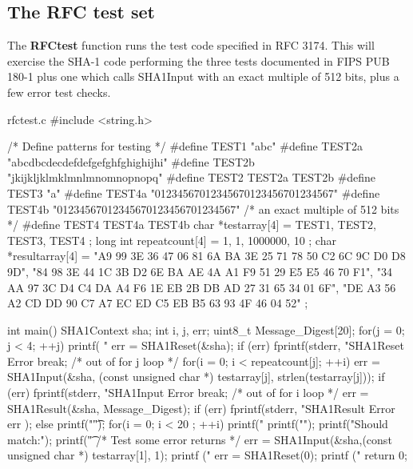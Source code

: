 \subsection{The RFC test set}
\noindent
The {\bf RFCtest} function runs the test code specified in RFC 3174\cite{30}.
This will exercise the SHA-1 code performing the three
tests documented in FIPS PUB 180-1 plus one which calls
SHA1Input with an exact multiple of 512 bits, plus a few
error test checks.
\begin{chunk}{rfctest.c}
#include <string.h>

/* Define patterns for testing */
#define TEST1   "abc"
#define TEST2a  "abcdbcdecdefdefgefghfghighijhi"
#define TEST2b  "jkijkljklmklmnlmnomnopnopq"
#define TEST2   TEST2a TEST2b
#define TEST3   "a"
#define TEST4a  "01234567012345670123456701234567"
#define TEST4b  "01234567012345670123456701234567"
/* an exact multiple of 512 bits */
#define TEST4   TEST4a TEST4b
char *testarray[4] = { TEST1, TEST2, TEST3, TEST4 };
long int repeatcount[4] = { 1, 1, 1000000, 10 };
char *resultarray[4] = {
    "A9 99 3E 36 47 06 81 6A BA 3E 25 71 78 50 C2 6C 9C D0 D8 9D",
    "84 98 3E 44 1C 3B D2 6E BA AE 4A A1 F9 51 29 E5 E5 46 70 F1",
    "34 AA 97 3C D4 C4 DA A4 F6 1E EB 2B DB AD 27 31 65 34 01 6F",
    "DE A3 56 A2 CD DD 90 C7 A7 EC ED C5 EB B5 63 93 4F 46 04 52"
};

int main() {
  SHA1Context sha;
  int i, j, err;
  uint8_t Message_Digest[20];
  for(j = 0; j < 4; ++j) {
    printf( "\nTest %
    err = SHA1Reset(&sha);
    if (err) {
      fprintf(stderr, "SHA1Reset Error %
      break; /* out of for j loop */
    }
    for(i = 0; i < repeatcount[j]; ++i) {
      err = SHA1Input(&sha,
                      (const unsigned char *) testarray[j],
                      strlen(testarray[j]));
      if (err) {
        fprintf(stderr, "SHA1Input Error %
        break;    /* out of for i loop */
      }
    }
    err = SHA1Result(&sha, Message_Digest);
    if (err) {
      fprintf(stderr,
             "SHA1Result Error %
             err );
    } else {
      printf("\t");
      for(i = 0; i < 20 ; ++i) {
        printf("%
      }
      printf("\n");
    }
    printf("Should match:\n");
    printf("\t%
  }
  /* Test some error returns */
  err = SHA1Input(&sha,(const unsigned char *) testarray[1], 1);
  printf ("\nError %
  err = SHA1Reset(0);
  printf ("\nError %
  return 0;
}

\end{chunk}

